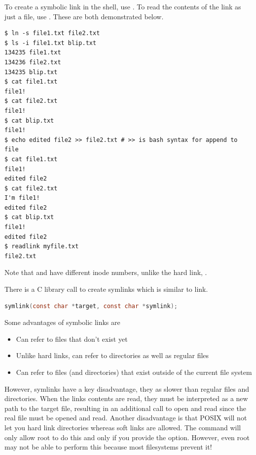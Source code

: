 \begin{enumerate}
        To create a symbolic link in the shell, use .
        To read the contents of the link as just a file, use .
        These are both demonstrated below.

\begin{verbatim}
$ ln -s file1.txt file2.txt
$ ls -i file1.txt blip.txt
134235 file1.txt
134236 file2.txt
134235 blip.txt
$ cat file1.txt
file1!
$ cat file2.txt
file1!
$ cat blip.txt
file1!
$ echo edited file2 >> file2.txt # >> is bash syntax for append to file
$ cat file1.txt
file1!
edited file2
$ cat file2.txt
I'm file1!
edited file2
$ cat blip.txt
file1!
edited file2
$ readlink myfile.txt
file2.txt
\end{verbatim}

        Note that  and  have different inode numbers, unlike the hard link, .

        There is a C library call to create symlinks which is similar to link.

\begin{lstlisting}[language=C]
symlink(const char *target, const char *symlink);
\end{lstlisting}

        Some advantages of symbolic links are

        \begin{itemize}
            \tightlist
                \item Can refer to files that don't exist yet
                \item Unlike hard links, can refer to directories as well as regular files
                \item Can refer to files (and directories) that exist outside of the current file system
        \end{itemize}

        However, symlinks have a key disadvantage, they as slower than regular files and directories.
        When the links contents are read, they must be interpreted as a new path to the target file, resulting in an additional call to open and read since the real file must be opened and read.
        Another disadvantage is that POSIX will not let you hard link directories whereas soft links are allowed.
        The  command will only allow root to do this and only if you provide the  option.
        However, even root may not be able to perform this because most filesystems prevent it!
\end{enumerate}

